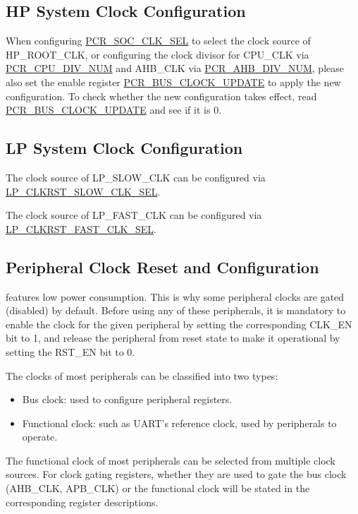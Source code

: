 \documentclass[main\_\_EN.tex]{subfiles}
\begin{document}
\subsection{HP System Clock Configuration}

When configuring \hyperref[fielddesc:PCRSOCCLKSEL]{PCR\_SOC\_CLK\_SEL} to select the clock source of HP\_ROOT\_CLK, or configuring the clock divisor for CPU\_CLK via \hyperref[fielddesc:PCRCPUDIVNUM]{PCR\_CPU\_DIV\_NUM} and AHB\_CLK via \hyperref[fielddesc:PCRAHBDIVNUM]{PCR\_AHB\_DIV\_NUM}, please also set the enable register \hyperref[fielddesc:PCRBUSCLOCKUPDATE]{PCR\_BUS\_CLOCK\_UPDATE} to apply the new configuration. To check whether the new configuration takes effect, read \hyperref[fielddesc:PCRBUSCLOCKUPDATE]{PCR\_BUS\_CLOCK\_UPDATE} and see if it is 0.

\subsection{LP System Clock Configuration}

The clock source of LP\_SLOW\_CLK can be configured via  \hyperref[fielddesc:LPCLKRSTSLOWCLKSEL]{LP\_CLKRST\_SLOW\_CLK\_SEL}.

The clock source of LP\_FAST\_CLK can be configured via  \hyperref[fielddesc:LPCLKRSTFASTCLKSEL]{LP\_CLKRST\_FAST\_CLK\_SEL}.

\subsection{Peripheral Clock Reset and Configuration}\label{sec:resclk-periperal-clock-configuration}

\begin{importantlisting}
\vspace{-0.5em}

\chipname{} features low power consumption. This is why some peripheral clocks are gated (disabled) by default. Before using any of these peripherals, it is mandatory to enable the clock for the given peripheral by setting the corresponding CLK\_EN bit to 1, and release the peripheral from reset state to make it operational by setting the RST\_EN bit to 0.
\end{importantlisting}

The clocks of most peripherals can be classified into two types:
\begin{itemize}
    \item Bus clock: used to configure peripheral registers.
    \item Functional clock: such as UART's reference clock, used by peripherals to operate.
\end{itemize}
The functional clock of most peripherals can be selected from multiple clock sources. For clock gating registers, whether they are used to gate the bus clock (AHB\_CLK, APB\_CLK) or the functional clock will be stated in the corresponding register descriptions.
\end{document}
